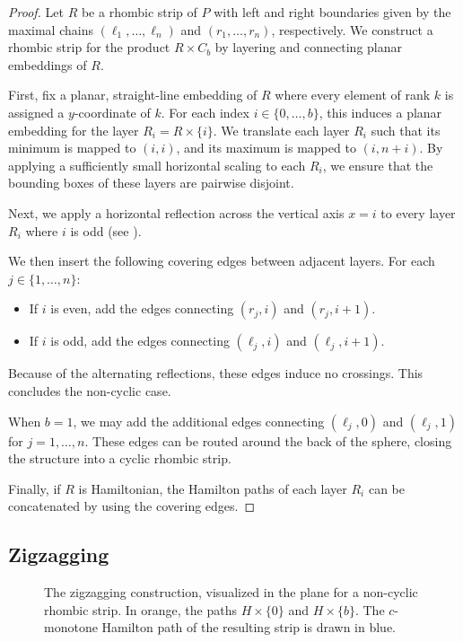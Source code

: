 \documentclass[fontsize=11pt,a4paper,DIV=12]{scrartcl}
\begin{document}
\unfolding*
\begin{proof}
Let $R$ be a rhombic strip of $P$ with left and right boundaries given by the maximal chains $(\ell_1, \ldots, \ell_n)$ and $(r_1, \ldots, r_n)$, respectively. We construct a rhombic strip for the product $R \times C_b$ by layering and connecting planar embeddings of $R$.

First, fix a planar, straight-line embedding of $R$ where every element of rank $k$ is assigned a $y$-coordinate of $k$. For each index $i \in \{0, \ldots, b\}$, this induces a planar embedding for the layer $R_i = R \times \{i\}$. We translate each layer $R_i$ such that its minimum is mapped to $(i, i)$, and its maximum is mapped to $(i, n+i)$. By applying a sufficiently small horizontal scaling to each $R_i$, we ensure that the bounding boxes of these layers are pairwise disjoint. 

Next, we apply a horizontal reflection across the vertical axis $x=i$ to every layer $R_i$ where $i$ is odd (see ).

We then insert the following covering edges between adjacent layers. For each $j \in \{1, \ldots, n\}$:
\begin{itemize}
    \item If $i$ is even, add the edges connecting $(r_j, i)$ and $(r_j, i+1)$.
    \item If $i$ is odd, add the edges connecting $(\ell_j, i)$ and $(\ell_j, i+1)$.
\end{itemize}

Because of the alternating reflections, these edges induce no crossings. This concludes the non-cyclic case.

When $b=1$, we may add the additional edges connecting $(\ell_j, 0)$ and $(\ell_j, 1)$ for $j = 1, \ldots, n$. These edges can be routed around the back of the sphere, closing the structure into a cyclic rhombic strip.

Finally, if $R$ is Hamiltonian, the Hamilton paths of each layer $R_i$ can be concatenated by using the covering edges.
\end{proof}

\subsection{Zigzagging}

\begin{figure}[!ht]
    \centering
    
    \caption{The zigzagging construction, visualized in the plane for a non-cyclic rhombic strip. In orange, the paths $H\times\{0\}$ and $H\times\{b\}$. The $c$-monotone Hamilton path of the resulting strip is drawn in blue.}
    \label{fig:zigzagging}
\end{figure}
\end{document}
